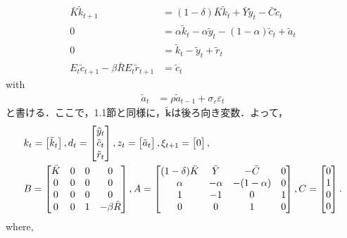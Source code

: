 \documentclass[a4j, dvipdfmx]{jarticle}
\begin{document}
\begin{align}
\bar K \tilde k_{t+1} &= (1-\delta) \bar K \tilde k_t  + \bar Y \tilde y_t - \bar C \tilde c_t\label{rbc1}\\
0 &= \alpha \tilde k_t -\alpha \tilde y_t - (1-\alpha) \tilde c_t + \tilde a_t\label{rbc3}\\
0 &= \tilde k_t - \tilde y_t + \tilde r_t\label{rbc4}\\
E_t\tilde c_{t+1} - \beta \bar R E_t \tilde r_{t+1} &= \tilde c_t\label{rbc5}
\end{align}
with
\begin{align*}
\tilde a_t &= \rho \tilde a_{t-1} + \sigma_\varepsilon \varepsilon_t\label{rbc2}
\end{align*}
と書ける．ここで，1.1節と同様に，$\boldsymbol{\tilde k}$は後ろ向き変数．よって，
\begin{align}
&k_t = \begin{bmatrix}\tilde k_t\end{bmatrix}, d_t = \begin{bmatrix}\tilde y_t \\ \tilde c_t \\ \tilde r_t\end{bmatrix}, z_t = \begin{bmatrix}\tilde a_t\end{bmatrix},\xi_{t+1} = \begin{bmatrix}0\end{bmatrix},\notag\\
&B = \begin{bmatrix}\bar K & 0 & 0 & 0\\
0 & 0 & 0 & 0\\
0 & 0 & 0 & 0\\
0 & 0 & 1 & -\beta \bar R\end{bmatrix},
A = \begin{bmatrix}(1-\delta) \bar K & \bar Y & -\bar C & 0\\
\alpha & -\alpha & -(1-\alpha) & 0\\
1 & -1 & 0 & 1\\
0 & 0 & 1 & 0\end{bmatrix},
C = \begin{bmatrix}0 \\ 1 \\ 0 \\ 0\end{bmatrix}.
\end{align}
where,
\end{document}
